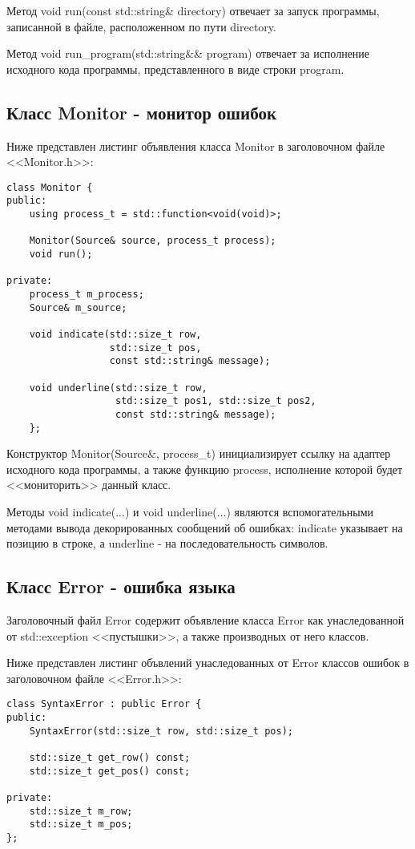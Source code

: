 Метод void run(const std::string\& directory)
отвечает за запуск программы, 
записанной в файле, расположенном по пути directory.

Метод void run\_program(std::string\&\& program)
отвечает за исполнение исходного кода
программы, представленного в виде строки program.

\subsection{Класс Monitor - монитор ошибок}

Ниже представлен листинг объявления класса Monitor
в заголовочном файле <<Monitor.h>>:

\begin{verbatim}
class Monitor {
public:
    using process_t = std::function<void(void)>;

    Monitor(Source& source, process_t process);
    void run();
    
private:
    process_t m_process;
    Source& m_source;

    void indicate(std::size_t row, 
                  std::size_t pos,
                  const std::string& message);

    void underline(std::size_t row, 
                   std::size_t pos1, std::size_t pos2, 
                   const std::string& message);
    };    
\end{verbatim}

Конструктор Monitor(Source\&, process\_t)
инициализирует ссылку на адаптер исходного кода программы,
а также функцию process, 
исполнение которой будет <<мониторить>> данный класс.

Методы void indicate(...) и void underline(...)
являются вспомогательными методами вывода декорированных
сообщений об ошибках: indicate указывает на позицию в строке,
а underline - на последовательность символов.

\subsection{Класс Error - ошибка языка}

Заголовочный файл Error содержит объявление класса 
Error как унаследованной от std::exception <<пустышки>>,
а также производных от него классов.

Ниже представлен листинг объвлений унаследованных
от Error классов ошибок в заголовочном файле <<Error.h>>:

\begin{verbatim}
class SyntaxError : public Error {
public:
    SyntaxError(std::size_t row, std::size_t pos);

    std::size_t get_row() const;
    std::size_t get_pos() const;

private:
    std::size_t m_row;
    std::size_t m_pos;
};
\end{verbatim}

